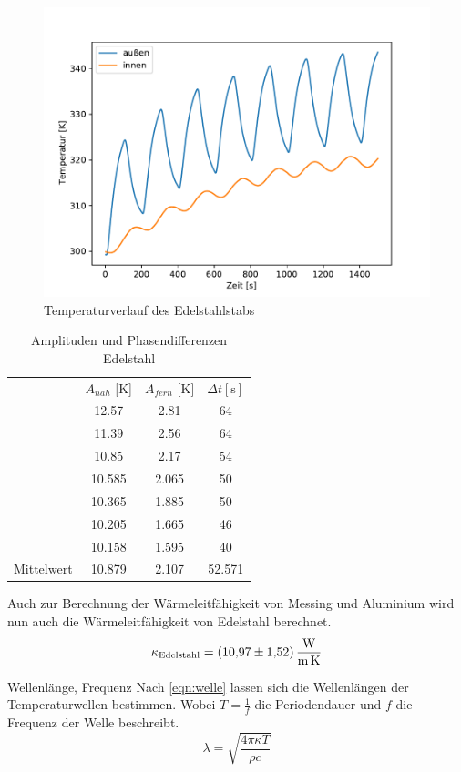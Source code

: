 \begin{figure}[!htbp]
  \centering
  \includegraphics{content/dyn_2.pdf}
  \caption{Temperaturverlauf des Edelstahlstabs}
  \label{fig:edel_dyn}
\end{figure}

\begin{table}[H]
	\centering
	\caption{Amplituden und Phasendifferenzen Edelstahl}
	\label{tab:AuPE}
	\begin{tabular}{l S S S[table-format=2.0]}
		\toprule
		&{$A_{nah}$ [K]} & {$A_{fern}$ [K]} &{$\Delta t [\si{\second}]$}\\
		\cmidrule(lr) {2-4}
		& 12.57 & 2.81& 64 \\
    & 11.39& 2.56 & 64\\
    &10.85& 2.17 & 54\\
    & 10.585 & 2.065 & 50 \\
    & 10.365& 1.885& 50\\
    & 10.205& 1.665& 46\\
    & 10.158& 1.595 & 40\\
    \cmidrule(lr) {2-4}
    {Mittelwert}&10.879&2.107 &52.571 \\
		\bottomrule
	\end{tabular}
\end{table}	

Auch zur Berechnung der Wärmeleitfähigkeit von Messing und Aluminium wird nun auch die Wärmeleitfähigkeit von Edelstahl berechnet.
\begin{align*}
  \kappa_{\text{Edelstahl}}&=\qty{10.97 +- 1.52}{\watt\per\meter\per\kelvin}\\
  \end{align*}

Wellenlänge, Frequenz
Nach \autoref{eqn:welle} lassen sich die Wellenlängen der Temperaturwellen bestimmen. Wobei $T=\frac{1}{f}$ die Periodendauer und $f$ die Frequenz der Welle beschreibt.
\begin{equation*}
  \label{eqn:welle}
  \lambda = \sqrt{\frac{4 \pi \kappa T}{\rho c}}
\end{equation*}





